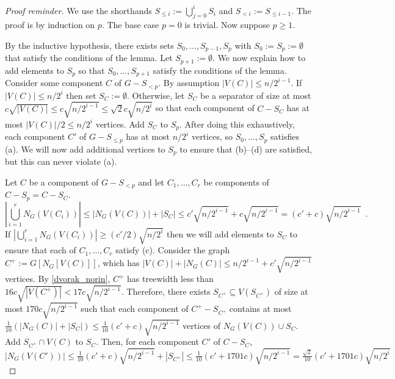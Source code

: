 \documentclass{patmorin}
\renewcommand{\ge}{\geqslant}
\renewcommand{\le}{\leqslant}
\begin{document}
\begin{proof}[Proof reminder]
  We use the shorthands $S_{\le i}:=\bigcup_{j=0}^i S_i$ and $S_{<i}:=S_{\le i-1}$.  The proof is by induction on $p$.  The base case $p=0$ is trivial.  Now suppose $p\ge 1$.

  By the inductive hypothesis, there exists sets $S_0,\ldots,S_{p-1},S_{p}$ with $S_0:=S_p:=\emptyset$ that satisfy the conditions of the lemma. Let $S_{p+1}:=\emptyset$.  We now explain how to add elements to $S_p$ so that $S_0,\ldots,S_{p+1}$ satisfy the conditions of the lemma. Consider some component $C$ of $G-S_{<p}$.  By assumption $|V(C)|\le n/2^{i-1}$.
  If $|V(C)|\le n/2^i$ then set $S_C:=\emptyset$.  Otherwise, let $S_C$ be a separator of size at most $c\sqrt{|V(C)|}\le c\sqrt{n/2^{i-1}}\le \sqrt{2}c\sqrt{n/2^i}$ so that each component of $C-S_C$ has at most $|V(C)|/2\le n/2^{i}$ vertices.
  Add $S_C$ to $S_p$.    After doing this exhaustively, each component $C'$ of $G-S_{\le p}$ has at most $n/2^i$ vertices, so $S_{0},\ldots,S_{p}$ satisfies (a).  We will now add additional vertices to $S_p$ to ensure that (b)--(d) are satisfied, but this can never violate (a).



  Let $C$ be a component of $G-S_{<p}$ and let $C_1,\ldots,C_r$ be components of $C-S_p=C-S_C$.
  \[
      \left|\bigcup_{i=1}^r N_G(V(C_i))\right|\le |N_G(V(C))|+|S_C| \le c'\sqrt{n/2^{i-1}}+c\sqrt{n/2^{i-1}} = (c'+c)\sqrt{n/2^{i-1}} \enspace .
  \]
  If $\left|\bigcup_{i=1}^r N_G(V(C_i))\right| \ge (c'/2)\sqrt{n/2^i}$ then we will add elements to $S_C$ to ensure that each of $C_1,\ldots,C_r$ satisfy (c).  Consider the graph $C^+:=G[N_G[V(C)]]$, which has $|V(C)|+|N_G(C)|\le n/2^{i-1} + c'\sqrt{n/2^{i-1}}$ vertices.  By \cref{dvorak_norin}, $C^+$ has treewidth less than $16c\sqrt{|V(C^+)|} < 17c\sqrt{n/2^{i-1}}$.  Therefore, there exists $S_{C^+}\subseteq V(S_{C^+})$ of size at most $170c\sqrt{n/2^{i-1}}$ such that each component of $C^+-S_{C^+}$ contains at most $\tfrac{1}{10}(|N_G(C)|+|S_C|)\le \tfrac{1}{10}(c'+c)\sqrt{n/2^{i-1}}$ vertices of $N_G(V(C))\cup S_C$.  Add $S_{C^+}\cap V(C)$ to $S_C$.  Then, for each component $C'$ of $C-S_C$,
  \[
   |N_G(V(C'))| \le \tfrac{1}{10}(c'+c)\sqrt{n/2^{i-1}} + |S_{C^+}|
   \le \tfrac{1}{10}(c'+1701c)\sqrt{n/2^{i-1}}
   = \tfrac{\sqrt{2}}{10}(c'+1701c)\sqrt{n/2^{i}}
  \]


\end{proof}
\end{document}
